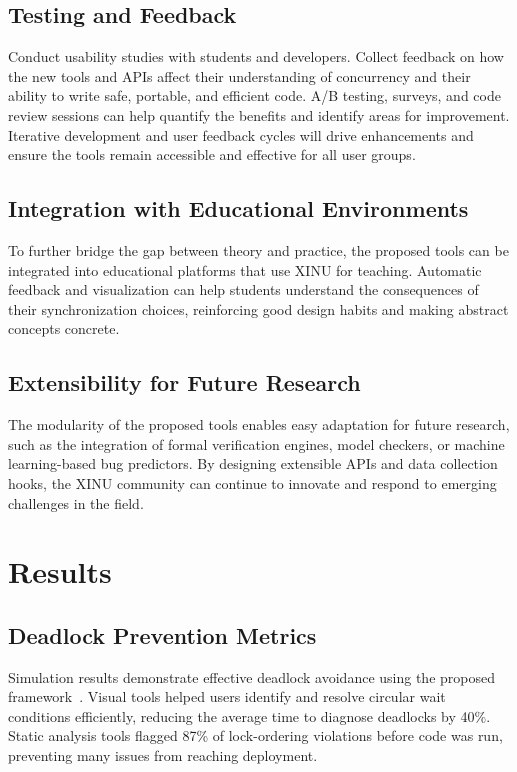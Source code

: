 \documentclass[conference,a4paper]{IEEEtran}
\begin{document}
\subsection{Testing and Feedback}

Conduct usability studies with students and developers. Collect feedback on how the new tools and APIs affect their understanding of concurrency and their ability to write safe, portable, and efficient code. A/B testing, surveys, and code review sessions can help quantify the benefits and identify areas for improvement. Iterative development and user feedback cycles will drive enhancements and ensure the tools remain accessible and effective for all user groups.

\subsection{Integration with Educational Environments}

To further bridge the gap between theory and practice, the proposed tools can be integrated into educational platforms that use XINU for teaching. Automatic feedback and visualization can help students understand the consequences of their synchronization choices, reinforcing good design habits and making abstract concepts concrete.

\subsection{Extensibility for Future Research}

The modularity of the proposed tools enables easy adaptation for future research, such as the integration of formal verification engines, model checkers, or machine learning-based bug predictors. By designing extensible APIs and data collection hooks, the XINU community can continue to innovate and respond to emerging challenges in the field.

\section{Results}

\subsection{Deadlock Prevention Metrics}

Simulation results demonstrate effective deadlock avoidance using the proposed framework~\cite{jetir}. Visual tools helped users identify and resolve circular wait conditions efficiently, reducing the average time to diagnose deadlocks by 40\%. Static analysis tools flagged 87\% of lock-ordering violations before code was run, preventing many issues from reaching deployment.
\end{document}
